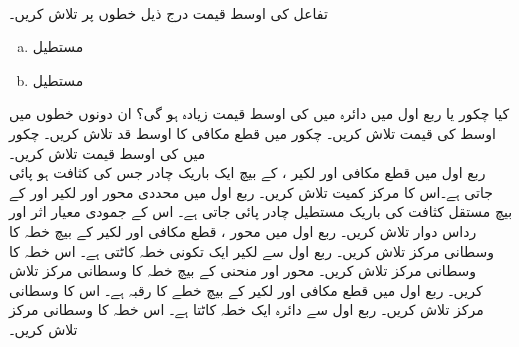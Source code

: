 \\
تفاعل  کی اوسط قیمت درج ذیل خطوں پر تلاش کریں۔
\begin{enumerate}[a.]
\item
مستطیل 
\item
مستطیل 
\end{enumerate}
کیا چکور  یا ربع اول میں دائرہ   میں   کی اوسط قیمت زیادہ ہو گی؟ ان دونوں خطوں میں اوسط کی قیمت تلاش کریں۔
چکور  میں قطع مکافی  کا  اوسط قد تلاش کریں۔
چکور  میں  کی اوسط قیمت تلاش کریں۔
\\
ربع اول میں قطع مکافی  اور لکیر ،  کے بیچ ایک باریک چادر جس کی کثافت  ہو  پائی جاتی ہے۔اس کا مرکز کمیت تلاش کریں۔
ربع اول میں محددی محور اور  لکیر  اور   کے بیچ  مستقل کثافت کی باریک  مستطیل چادر پائی جاتی ہے۔ اس کے جمودی  معیار اثر اور رداس دوار تلاش کریں۔
ربع اول میں محور ، قطع مکافی  اور لکیر  کے بیچ خطہ کا وسطانی مرکز تلاش کریں۔
ربع اول سے لکیر  ایک تکونی خطہ کاٹتی ہے۔ اس خطہ کا وسطانی مرکز تلاش کریں۔
محور  اور  منحنی  کے بیچ خطہ کا وسطانی مرکز تلاش کریں۔
ربع اول میں قطع مکافی   اور لکیر  کے بیچ خطے کا رقبہ  ہے۔ اس کا وسطانی مرکز تلاش کریں۔
ربع اول سے دائرہ   ایک خطہ کاٹتا ہے۔ اس خطہ کا وسطانی مرکز تلاش کریں۔
